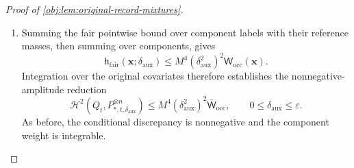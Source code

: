 \documentclass[11pt]{article}
\begin{document}
\begin{proof}[Proof of \cref{obj:lem:original-record-mixtures}]
\begin{enumerate}
At zero amplitude the random and comparator tables coincide, so
\[
\mathsf D_{\mathcal V}^{\mathrm{fair}}(0)=0.
\]
The fair root is even in its amplitude by
\cref{obj:lem:exact-calibrations}; the comparator effect in
\cref{obj:def:calibration-maps} depends on the amplitude through its
square. Reversing the component signs consequently proves
\[
\mathsf D_{\mathcal V}^{\mathrm{fair}}(-\delta_0)
=\mathsf D_{\mathcal V}^{\mathrm{fair}}(\delta_0).
\]
Differentiating this equality at zero, using the supplied smoothness,
gives
\[
(\mathsf D_{\mathcal V}^{\mathrm{fair}})'(0)
=-(\mathsf D_{\mathcal V}^{\mathrm{fair}})'(0)=0.
\]
If \(\delta_{\mathrm{aux}}=0\), the difference is already zero. If
\(\delta_{\mathrm{aux}}>0\), Taylor's theorem with Lagrange remainder
provides \(\delta_{\mathrm{mid}}\in(0,\delta_{\mathrm{aux}})\) such that
\[
\mathsf D_{\mathcal V}^{\mathrm{fair}}(\delta_{\mathrm{aux}})
=
\frac{\delta_{\mathrm{aux}}^2}{2}
(\mathsf D_{\mathcal V}^{\mathrm{fair}})''(\delta_{\mathrm{mid}}).
\]
Thus in either case,
\[
|\mathsf D_{\mathcal V}^{\mathrm{fair}}(\delta_{\mathrm{aux}})|
\le
M^2m_{\mathcal V}^2 2^{m_{\mathcal V}}\delta_{\mathrm{aux}}^2
\le
2M^2m_{\mathcal V}^2 2^{m_{\mathcal V}}\delta_{\mathrm{aux}}^2.
\]
Using this last bound and the two positive floors,
\[
\begin{aligned}
\left(
\sqrt{\mathsf L_{t,\mathcal V}^{\mathrm{fair}}}
-\sqrt{\mathsf L_{*,\mathcal V}^{\mathrm{fair}}}
\right)^2
&=
\frac{(\mathsf D_{\mathcal V}^{\mathrm{fair}}
(\delta_{\mathrm{aux}}))^2}
{\left(
\sqrt{\mathsf L_{t,\mathcal V}^{\mathrm{fair}}}
+\sqrt{\mathsf L_{*,\mathcal V}^{\mathrm{fair}}}
\right)^2}\\
&\le
\frac{4M^4m_{\mathcal V}^4 4^{m_{\mathcal V}}
\delta_{\mathrm{aux}}^4}{4\,2^{-m_{\mathcal V}}}\\
&=M^4\delta_{\mathrm{aux}}^4\mathsf w_{\mathcal V}.
\end{aligned}
\]
Together with the small-component cases, this estimate holds for every
\(\mathcal V\in\mathscr B_{\mathbf x}\).

\item Summing the fair pointwise bound over component labels with their
reference masses, then summing over components, gives
\[
\mathsf h_{\mathrm{fair}}(\mathbf x;\delta_{\mathrm{aux}})
\le
M^4(\delta_{\mathrm{aux}}^2)^2
\mathsf W_{\mathrm{occ}}(\mathbf x).
\]
Integration over the original covariates therefore establishes the
nonnegative-amplitude reduction
\[
\mathcal H^2(Q_t,P_{*,t,\delta_{\mathrm{aux}}}^{\otimes n})
\le
M^4(\delta_{\mathrm{aux}}^2)^2
\overline{\mathsf W}_{\mathrm{occ}},
\qquad 0\le\delta_{\mathrm{aux}}\le\varepsilon.
\]
As before, the conditional discrepancy is nonnegative and the
component weight is integrable.


\end{enumerate}
\end{proof}
\end{document}
